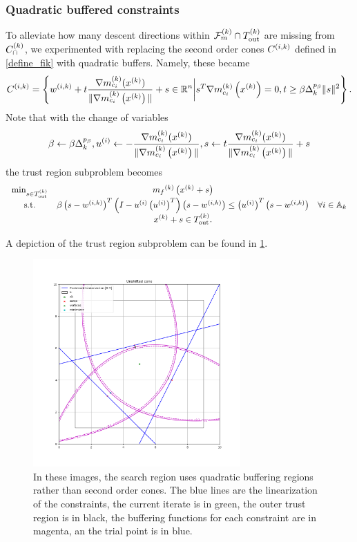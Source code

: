 \subsubsection{Quadratic buffered constraints}
\label{quadratic_buffered_description}

To alleviate how many descent directions within ${\mathcal F_m^{(k)}} \cap {T_{\text{out}}^{(k)}}$ are missing from ${C^{(k)}_{\cap}}$, 
we experimented with replacing the second order cones ${C^{(i, k)}}$ defined in \cref{define_fik} with quadratic buffers.
Namely, these became
\begin{align*}
{C^{(i, k)}} = \left\{{w^{(i, k)}} + t{\frac{\nabla m^{(k)}_{c_i}(x^{(k)})}{\|\nabla m^{(k)}_{c_i}\left(x^{(k)}\right)\|}} + s \in \mathbb R^n \bigg |  s^T{\nabla m_{c_i}^{(k)}\left(x^{(k)}\right)} = 0, t \ge \beta \Delta_k^{p_{\beta}} \|s\|^2 \right\}.
\end{align*}
Note that with the change of variables 
\begin{align*}
\beta \gets \beta \Delta_k^{p_{\beta}}, u^{(i)} \gets -{\frac{\nabla m^{(k)}_{c_i}(x^{(k)})}{\|\nabla m^{(k)}_{c_i}\left(x^{(k)}\right)\|}}, s \gets t{\frac{\nabla m^{(k)}_{c_i}(x^{(k)})}{\|\nabla m^{(k)}_{c_i}\left(x^{(k)}\right)\|}} + s
\end{align*}
the trust region subproblem becomes
\begin{align*}
\begin{array}{ccc}
\min_{s \in {T_{\text{out}}^{(k)}}} & {{m}_f}^{(k)}\left(x^{(k)} + s\right) & \\
\textrm{s.t.} & \beta \left(s-{w^{(i, k)}}\right)^T\left(I - u^{(i)}\left(u^{(i)}\right)^T\right) \left(s-{w^{(i, k)}}\right)\le \left(u^{(i)}\right)^T\left(s-{w^{(i, k)}}\right) & \forall i \in {\mathbb A_{k}} \\
& x^{(k)} + s \in {T_{\text{out}}^{(k)}}. &
\end{array}
\end{align*}


A depiction of the trust region subproblem can be found in \cref{quadratic_buffered}.

\begin{figure}[ht]
    \centering
    \includegraphics[width=300px]{images/quadratic_buffered.png}
    \caption[The quadratic buffered region.]
	{
		In these images, the search region uses quadratic buffering regions rather than second order cones.
		The blue lines are the linearization of the constraints,
		the current iterate is in green,
		the outer trust region is in black,
		the buffering functions for each constraint are in magenta,
		an the trial point is in blue.
    }
    \label{quadratic_buffered}
\end{figure}


